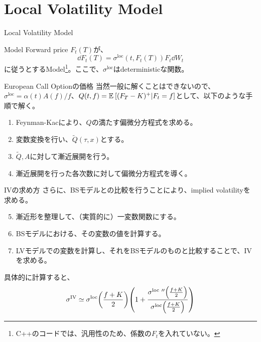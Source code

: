 \documentclass[dvipdfmx,9pt]{beamer}
\begin{document}
\section{Local Volatility Model}
\begin{frame}{Local Volatility Model}
  \begin{block}{Model}
    Forward price $F_{t}(T)$が、
    \begin{equation}
      \dd F_{t}(T) = \sigma^{\mathrm{loc}}(t,F_{t}(T)) F_{t} \dd W_{t}
    \end{equation}
    に従うとするModel\footnote{C++のコードでは、汎用性のため、係数の$F_{t}$を入れていない。}。ここで、$\sigma^{\mathrm{loc}}$はdeterministicな関数。
  \end{block}
  \begin{block}{European Call Optionの価格}
    当然一般に解くことはできないので、$\sigma^{\mathrm{loc}} = \alpha(t)A(f)/f$、$Q(t,f) = \exv[]{(F_{T} - K)^{+}|F_{t}=f}$として、以下のような手順で解く。
    \begin{enumerate}
      \item Feynman-Kacにより、$Q$の満たす偏微分方程式を求める。
      \item 変数変換を行い、$\tilde{Q}(\tau,x)$とする。
      \item $\tilde{Q},A$に対して漸近展開を行う。
      \item 漸近展開を行った各次数に対して偏微分方程式を導く。
    \end{enumerate}
  \end{block}
\end{frame}

\begin{frame}
  \begin{block}{IVの求め方}
    さらに、BSモデルとの比較を行うことにより、implied volatilityを求める。
    \begin{enumerate}
      \setcounter{enumi}{4}
      \item 漸近形を整理して、（実質的に）一変数関数にする。
      \item BSモデルにおける、その変数の値を計算する。
      \item LVモデルでの変数を計算し、それをBSモデルのものと比較することで、IVを求める。
    \end{enumerate}
    具体的に計算すると、
    \begin{equation}
      \sigma^{\mathrm{IV}} \simeq \sigma^{\mathrm{loc}}\pqty{\frac{f+K}{2}}\pqty{1 + \frac{\sigma^{\mathrm{\mathrm{loc}}~\prime\prime}\pqty{\frac{f+K}{2}}}{\sigma^{\mathrm{loc}}\pqty{\frac{f+K}{2}}}}
    \end{equation}
  \end{block}
\end{frame}
\end{document}
